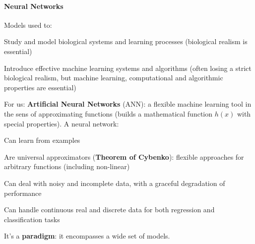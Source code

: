 \documentclass[10pt]{report}
\begin{document}
\paragraph{Neural Networks} Models used to:
\begin{list}{}{}
	\item Study and model biological systems and learning processes (biological realism is essential)
	\item Introduce effective machine learning systems and algorithms (often losing a strict biological realism, but machine learning, computational and algorithmic properties are essential)
\end{list}
For us: \textbf{Artificial Neural Networks} (ANN): a flexible machine learning tool in the sens of approximating functions (builds a mathematical function $h(x)$ with special properties). A neural network:
\begin{list}{}{}
	\item Can learn from examples
	\item Are universal approximators (\textbf{Theorem of Cybenko}): flexible approaches for arbitrary functions (including non-linear)
	\item Can deal with noisy and incomplete data, with a graceful degradation of performance
	\item Can handle continuous real and discrete data for both regression and classification tasks
	\item It's a \textbf{paradigm}: it encompasses a wide set of models.
\end{list}
\end{document}
